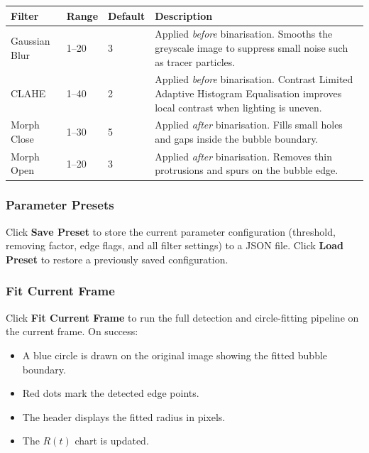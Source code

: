 \documentclass[11pt, letterpaper]{article}
\begin{document}
\begin{center}
\begin{tabular}{lllp{6cm}}
    \toprule
    \textbf{Filter} & \textbf{Range} & \textbf{Default} & \textbf{Description} \\
    \midrule
    Gaussian Blur & 1--20 & 3 & Applied \emph{before} binarisation.
        Smooths the greyscale image to suppress small noise such as tracer
        particles. \\[4pt]
    CLAHE & 1--40 & 2 & Applied \emph{before} binarisation. Contrast
        Limited Adaptive Histogram Equalisation improves local contrast
        when lighting is uneven. \\[4pt]
    Morph Close & 1--30 & 5 & Applied \emph{after} binarisation. Fills
        small holes and gaps inside the bubble boundary. \\[4pt]
    Morph Open & 1--20 & 3 & Applied \emph{after} binarisation. Removes
        thin protrusions and spurs on the bubble edge. \\
    \bottomrule
\end{tabular}
\end{center}

\subsubsection{Parameter Presets}

Click \textbf{Save Preset} to store the current parameter configuration
(threshold, removing factor, edge flags, and all filter settings) to a JSON
file. Click \textbf{Load Preset} to restore a previously saved configuration.

\subsubsection{Fit Current Frame}

Click \textbf{Fit Current Frame} to run the full detection and circle-fitting
pipeline on the current frame. On success:

\begin{itemize}
    \item A \textcolor{primaryblue}{blue circle} is drawn on the original
          image showing the fitted bubble boundary.
    \item \textcolor{errorred}{Red dots} mark the detected edge points.
    \item The header displays the fitted radius in pixels.
    \item The $R(t)$ chart is updated.
\end{itemize}
\end{document}
